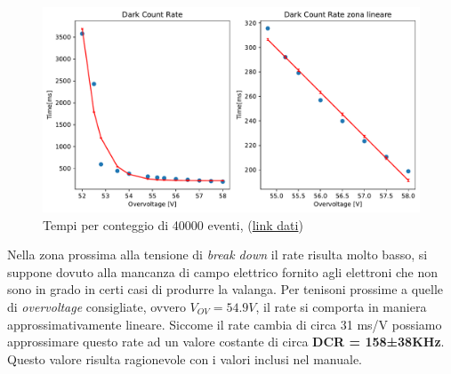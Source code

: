 \begin{figure}[!h]
    \centering
    \includegraphics[width=0.6\linewidth]{analog/assets/SiPm/SiPm_DCR.pdf}
    \caption{Tempi per conteggio di 40000 eventi, (\href{https://github.com/Yedi278/Esperimentazioni-Elettronica/tree/main/SiPm/Caratterizzazione\%20Hamamatsu}{link dati})}
\end{figure}

Nella zona prossima alla tensione di \textit{break down} il rate risulta molto basso, si suppone dovuto alla mancanza di campo elettrico fornito agli elettroni che non sono in grado in certi casi di produrre la valanga. Per tenisoni prossime a quelle di \textit{overvoltage} consigliate, ovvero $V_{OV} = 54.9V$, il rate si comporta in maniera approssimativamente lineare. Siccome il rate cambia di circa 31 ms/V possiamo approssimare questo rate ad un valore costante di circa \textbf{DCR = 158±38KHz}.
Questo valore risulta ragionevole con i valori inclusi nel manuale.